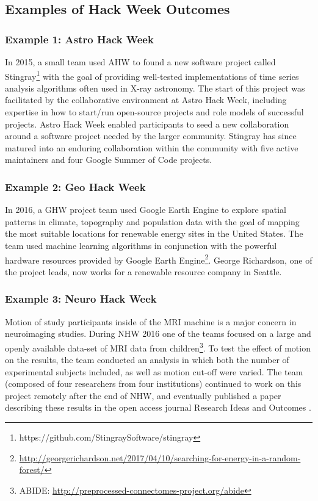 \subsection*{Examples of Hack Week Outcomes}
\label{sec:outcomes}
\subsubsection*{Example 1: Astro Hack Week}
In 2015, a small team used AHW to found a new software project called Stingray\footnote{https://github.com/StingraySoftware/stingray} with the goal of providing well-tested implementations of time series analysis algorithms often used in X-ray astronomy.
The start of this project was facilitated by the collaborative environment at Astro Hack Week, including expertise in how to start/run open-source projects and role models of successful projects. Astro Hack Week enabled participants to seed a new collaboration around a software project needed by the larger community.
Stingray has since matured into an enduring collaboration within the community with five active maintainers and four Google Summer of Code projects.
\subsubsection*{Example 2: Geo Hack Week}
In 2016, a GHW project team used Google Earth Engine to explore spatial patterns in climate, topography and population data with the goal of mapping the most suitable locations for renewable energy sites in the United States.
The team used machine learning algorithms in conjunction with the powerful hardware resources provided by Google Earth Engine\footnote{\url{http://georgerichardson.net/2017/04/10/searching-for-energy-in-a-random-forest/}}.
George Richardson, one of the project leads, now works for a renewable resource company in Seattle.
\subsubsection*{Example 3: Neuro Hack Week}
Motion of study participants inside of the MRI machine is a major concern in neuroimaging studies.
During NHW 2016 one of the teams focused on a large and openly available data-set of MRI data from children\footnote{ABIDE: \url{http://preprocessed-connectomes-project.org/abide}}.
To test the effect of motion on the results, the team conducted an analysis in which both the number of experimental subjects included, as well as motion cut-off were varied.
The team (composed of four researchers from four institutions) continued to work on this project remotely after the end of NHW, and eventually published a paper describing these results in the open access journal Research Ideas and Outcomes \cite{leonard2017}.
